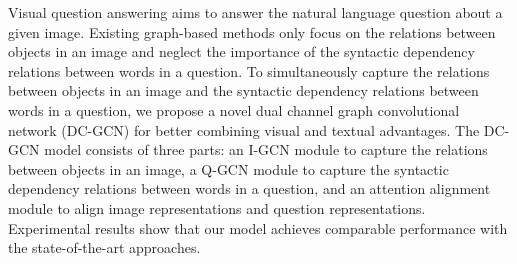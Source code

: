 Visual question answering aims to answer the natural language question about a given image. Existing graph-based methods only focus on the relations between objects in an image and neglect the importance of the syntactic dependency relations between words in a question. To simultaneously capture the relations between objects in an image and the syntactic dependency relations between words in a question, we propose a novel dual channel graph convolutional network (DC-GCN) for better combining visual and textual advantages. The DC-GCN model consists of three parts: an I-GCN module to capture the relations between objects in an image, a Q-GCN module to capture the syntactic dependency relations between words in a question, and an attention alignment module to align image representations and question representations. Experimental results show that our model achieves comparable performance with the state-of-the-art approaches.
